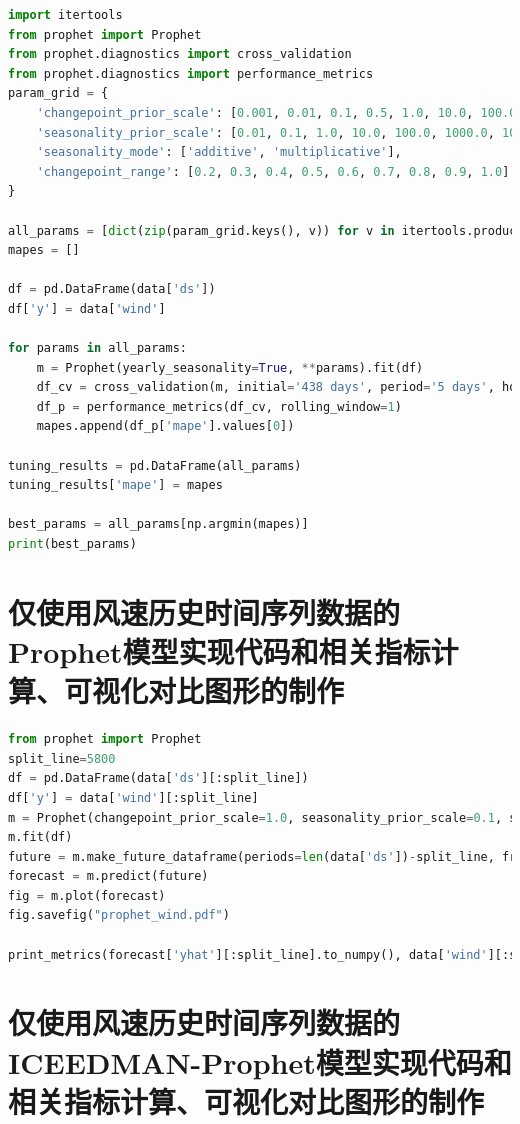 \documentclass[AutoFakeBold]{LZUThesis}
\begin{document}
\begin{lstlisting}[language = python]
import itertools
from prophet import Prophet
from prophet.diagnostics import cross_validation
from prophet.diagnostics import performance_metrics
param_grid = {  
    'changepoint_prior_scale': [0.001, 0.01, 0.1, 0.5, 1.0, 10.0, 100.0, 1000.0, 10000.0],
    'seasonality_prior_scale': [0.01, 0.1, 1.0, 10.0, 100.0, 1000.0, 10000.0],
    'seasonality_mode': ['additive', 'multiplicative'],
    'changepoint_range': [0.2, 0.3, 0.4, 0.5, 0.6, 0.7, 0.8, 0.9, 1.0]
}

all_params = [dict(zip(param_grid.keys(), v)) for v in itertools.product(*param_grid.values())]
mapes = []

df = pd.DataFrame(data['ds'])
df['y'] = data['wind']

for params in all_params:
    m = Prophet(yearly_seasonality=True, **params).fit(df)
    df_cv = cross_validation(m, initial='438 days', period='5 days', horizon = '5 days', parallel="processes")
    df_p = performance_metrics(df_cv, rolling_window=1)
    mapes.append(df_p['mape'].values[0])

tuning_results = pd.DataFrame(all_params)
tuning_results['mape'] = mapes

best_params = all_params[np.argmin(mapes)]
print(best_params)
\end{lstlisting}

\section{仅使用风速历史时间序列数据的Prophet模型实现代码和相关指标计算、可视化对比图形的制作}

\begin{lstlisting}[language = python]
from prophet import Prophet
split_line=5800
df = pd.DataFrame(data['ds'][:split_line])
df['y'] = data['wind'][:split_line]
m = Prophet(changepoint_prior_scale=1.0, seasonality_prior_scale=0.1, seasonality_mode='additive', changepoint_range=1, yearly_seasonality=True)
m.fit(df)
future = m.make_future_dataframe(periods=len(data['ds'])-split_line, freq='3H')
forecast = m.predict(future)
fig = m.plot(forecast)
fig.savefig("prophet_wind.pdf")

print_metrics(forecast['yhat'][:split_line].to_numpy(), data['wind'][:split_line].to_numpy())
\end{lstlisting}

\section{仅使用风速历史时间序列数据的ICEEDMAN-Prophet模型实现代码和相关指标计算、可视化对比图形的制作}
\end{document}

